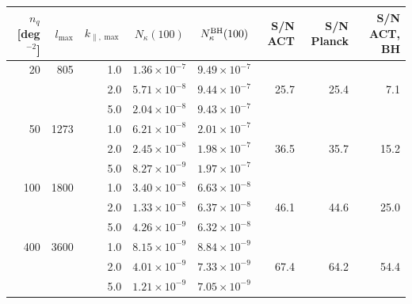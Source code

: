 \begin{tabular}{rrrccrrr}
\toprule
$n_q$ [deg$^{-2}$] & $l_{\max}$ & $k_{\parallel,\max}$ & $N_\kappa(100)$ & $N_\kappa^{\rm BH}(100)$ & S/N ACT & S/N Planck & S/N ACT, BH\\
\midrule
20 & 805 & 1.0 & $1.36\times10^{-7}$ & $9.49\times10^{-7}$ &  &  &  \\
 &  & 2.0 & $5.71\times10^{-8}$ & $9.44\times10^{-7}$ & 25.7 & 25.4 & 7.1 \\
 &  & 5.0 & $2.04\times10^{-8}$ & $9.43\times10^{-7}$ &  &  &  \\
50 & 1273 & 1.0 & $6.21\times10^{-8}$ & $2.01\times10^{-7}$ &  &  &  \\
 &  & 2.0 & $2.45\times10^{-8}$ & $1.98\times10^{-7}$ & 36.5 & 35.7 & 15.2 \\
 &  & 5.0 & $8.27\times10^{-9}$ & $1.97\times10^{-7}$ &  &  &  \\
100 & 1800 & 1.0 & $3.40\times10^{-8}$ & $6.63\times10^{-8}$ &  &  &  \\
 &  & 2.0 & $1.33\times10^{-8}$ & $6.37\times10^{-8}$ & 46.1 & 44.6 & 25.0 \\
 &  & 5.0 & $4.26\times10^{-9}$ & $6.32\times10^{-8}$ &  &  &  \\
400 & 3600 & 1.0 & $8.15\times10^{-9}$ & $8.84\times10^{-9}$ &  &  &  \\
 &  & 2.0 & $4.01\times10^{-9}$ & $7.33\times10^{-9}$ & 67.4 & 64.2 & 54.4 \\
 &  & 5.0 & $1.21\times10^{-9}$ & $7.05\times10^{-9}$ &  &  &  \\
\bottomrule
\end{tabular}
